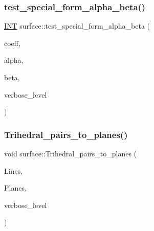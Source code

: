 \mbox{\label{classsurface_a21334591495270e78a3b248ada1fe8ff}} 
\subsubsection{\texorpdfstring{test\+\_\+special\+\_\+form\+\_\+alpha\+\_\+beta()}{test\_special\_form\_alpha\_beta()}}
{\footnotesize\ttfamily \mbox{\hyperlink{galois_8h_a09fddde158a3a20bd2dcadb609de11dc}{I\+NT}} surface\+::test\+\_\+special\+\_\+form\+\_\+alpha\+\_\+beta (\begin{DoxyParamCaption}\item[{\mbox{\hyperlink{galois_8h_a09fddde158a3a20bd2dcadb609de11dc}{I\+NT}} $\ast$}]{coeff,  }\item[{\mbox{\hyperlink{galois_8h_a09fddde158a3a20bd2dcadb609de11dc}{I\+NT}} \&}]{alpha,  }\item[{\mbox{\hyperlink{galois_8h_a09fddde158a3a20bd2dcadb609de11dc}{I\+NT}} \&}]{beta,  }\item[{\mbox{\hyperlink{galois_8h_a09fddde158a3a20bd2dcadb609de11dc}{I\+NT}}}]{verbose\+\_\+level }\end{DoxyParamCaption})}

\mbox{\label{classsurface_a1bfa6633e9cabf8cba5acbaab05137c5}} 
\subsubsection{\texorpdfstring{Trihedral\+\_\+pairs\+\_\+to\+\_\+planes()}{Trihedral\_pairs\_to\_planes()}}
{\footnotesize\ttfamily void surface\+::\+Trihedral\+\_\+pairs\+\_\+to\+\_\+planes (\begin{DoxyParamCaption}\item[{\mbox{\hyperlink{galois_8h_a09fddde158a3a20bd2dcadb609de11dc}{I\+NT}} $\ast$}]{Lines,  }\item[{\mbox{\hyperlink{galois_8h_a09fddde158a3a20bd2dcadb609de11dc}{I\+NT}} $\ast$}]{Planes,  }\item[{\mbox{\hyperlink{galois_8h_a09fddde158a3a20bd2dcadb609de11dc}{I\+NT}}}]{verbose\+\_\+level }\end{DoxyParamCaption})}

